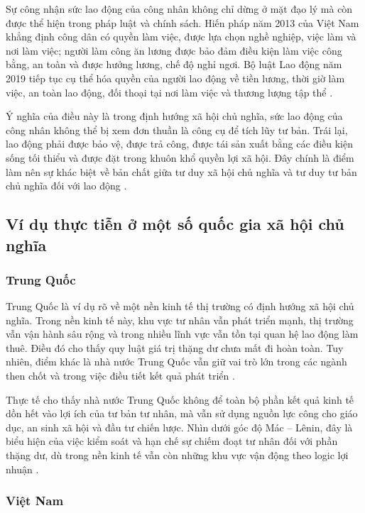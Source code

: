 Sự công nhận sức lao động của công nhân không chỉ dừng ở mặt đạo lý mà còn được thể hiện trong pháp luật và chính sách. Hiến pháp năm 2013 của Việt Nam khẳng định công dân có quyền làm việc, được lựa chọn nghề nghiệp, việc làm và nơi làm việc; người làm công ăn lương được bảo đảm điều kiện làm việc công bằng, an toàn và được hưởng lương, chế độ nghỉ ngơi. Bộ luật Lao động năm 2019 tiếp tục cụ thể hóa quyền của người lao động về tiền lương, thời giờ làm việc, an toàn lao động, đối thoại tại nơi làm việc và thương lượng tập thể \cite{hienphap2013,bollaodong2019}.

Ý nghĩa của điều này là trong định hướng xã hội chủ nghĩa, sức lao động của công nhân không thể bị xem đơn thuần là công cụ để tích lũy tư bản. Trái lại, lao động phải được bảo vệ, được trả công, được tái sản xuất bằng các điều kiện sống tối thiểu và được đặt trong khuôn khổ quyền lợi xã hội. Đây chính là điểm làm nên sự khác biệt về bản chất giữa tư duy xã hội chủ nghĩa và tư duy tư bản chủ nghĩa đối với lao động \cite{gt,hienphap2013,bollaodong2019}.

\subsection{Ví dụ thực tiễn ở một số quốc gia xã hội chủ nghĩa}

\subsubsection{Trung Quốc}

Trung Quốc là ví dụ rõ về một nền kinh tế thị trường có định hướng xã hội chủ nghĩa. Trong nền kinh tế này, khu vực tư nhân vẫn phát triển mạnh, thị trường vẫn vận hành sâu rộng và trong nhiều lĩnh vực vẫn tồn tại quan hệ lao động làm thuê. Điều đó cho thấy quy luật giá trị thặng dư chưa mất đi hoàn toàn. Tuy nhiên, điểm khác là nhà nước Trung Quốc vẫn giữ vai trò lớn trong các ngành then chốt và trong việc điều tiết kết quả phát triển \cite{china_gdp_2024,china_profit_2024}.

Thực tế cho thấy nhà nước Trung Quốc không để toàn bộ phần kết quả kinh tế dồn hết vào lợi ích của tư bản tư nhân, mà vẫn sử dụng nguồn lực công cho giáo dục, an sinh xã hội và đầu tư chiến lược. Nhìn dưới góc độ Mác -- Lênin, đây là biểu hiện của việc kiểm soát và hạn chế sự chiếm đoạt tư nhân đối với phần thặng dư, dù trong nền kinh tế vẫn còn những khu vực vận động theo logic lợi nhuận \cite{china_fiscal_2024,gt,lenin}.

\subsubsection{Việt Nam}

